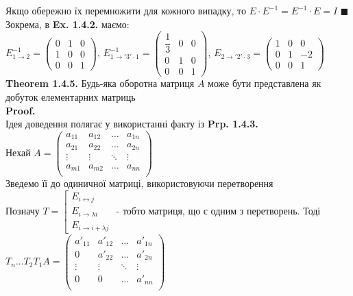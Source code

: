 \documentclass[a4paper, 14pt]{extarticle}
\def\th#1{\textbf{Theorem {#1}}}
\def\proof{\textbf{Proof.}\\}
\def\bigline{\vspace{5mm}\\}
\def\qed{$\blacksquare$}
\begin{document}
	Якщо обережно їх перемножити для кожного випадку, то $E \cdot E^{-1} = E^{-1} \cdot E = I$ \qed
	\bigline
	Зокрема, в \textbf{Ex. 1.4.2.} маємо:\\
	$E_{1 \rightarrow 2}^{-1} = \begin{pmatrix}
	0 & 1 & 0 \\
	1 & 0 & 0 \\
	0 & 0 & 1
	\end{pmatrix}$, $E_{1 \rightarrow '3' \cdot 1}^{-1} = \begin{pmatrix}
	\dfrac{1}{3} & 0 & 0 \\
	0 & 1 & 0 \\
	0 & 0 & 1
	\end{pmatrix}$, $E_{2 \rightarrow '2'\cdot 3} = \begin{pmatrix}
	1 & 0 & 0 \\
	0 & 1 & -2 \\
	0 & 0 & 1
	\end{pmatrix}$
	\bigline
	\th{1.4.5.} Будь-яка оборотна матриця $A$ може бути представлена як добуток елементарних матриць\\
	\proof
	Ідея доведення полягає у використанні факту із \textbf{Prp. 1.4.3.}\\
	Нехай
	$A = \begin{pmatrix}
	a_{11} & a_{12} & \dots & a_{1n} \\
	a_{21} & a_{22} & \dots & a_{2n} \\
	\vdots & \vdots & \ddots & \vdots \\
	a_{m1} & a_{m2} & \dots & a_{nn} \\
	\end{pmatrix}$ \\ Зведемо її до одиничної матриці, використовуючи перетворення\\
	Позначу $T = \left[ \begin{gathered} E_{i \leftrightarrow j} \\ E_{i \rightarrow \lambda i} \\ E_{i \rightarrow i + \lambda j} \end{gathered} \right.$ - тобто матриця, що є одним з перетворень. Тоді\\
	$T_n \dots T_2 T_1 A = \begin{pmatrix}
	a'_{11} & a'_{12} & \dots & a'_{1n} \\
	0 & a'_{22} & \dots & a'_{2n} \\
	\vdots & \vdots & \ddots & \vdots \\
	0 & 0 & \dots & a'_{nn} \\
	\end{pmatrix}$\\
\end{document}
